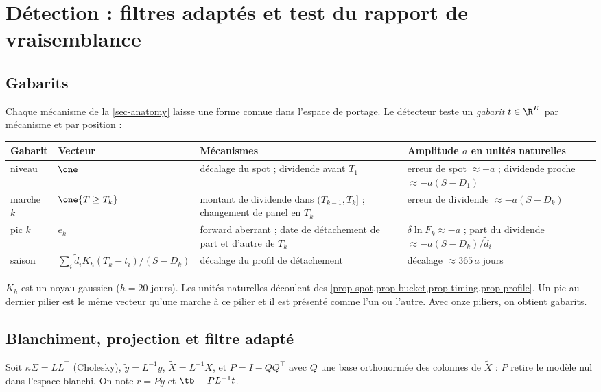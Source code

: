 \section{Détection : filtres adaptés et test du rapport de vraisemblance}\label{sec-detection}

\subsection{Gabarits}
Chaque mécanisme de la \cref{sec-anatomy} laisse une forme connue dans l'espace de portage. Le détecteur teste un
\emph{gabarit} $t\in\R^K$ par mécanisme et par position :
\begin{center}\small
\begin{tabular}{lp{3.3cm}p{4.3cm}p{4.6cm}}
\toprule
Gabarit & Vecteur & Mécanismes & Amplitude $a$ en unités naturelles\\
\midrule
niveau & $\one$ & décalage du spot ; dividende avant $T_1$ & erreur de spot $\approx-a$ ; dividende proche $\approx-a(S-D_1)$\\
marche $k$ & $\one\{T\ge T_k\}$ & montant de dividende dans $(T_{k-1},T_k]$ ; changement de panel en $T_k$ & erreur de dividende $\approx-a(S-D_k)$\\
pic $k$ & $e_k$ & forward aberrant ; date de détachement de part et d'autre de $T_k$ & $\delta\ln F_k\approx-a$ ; part du dividende $\approx-a(S-D_k)/\tilde d_i$\\
saison & $\sum_i\tilde d_iK_h(T_k-t_i)/(S-D_k)$ & décalage du profil de détachement & décalage $\approx365\,a$ jours\\
\bottomrule
\end{tabular}
\end{center}
$K_h$ est un noyau gaussien ($h=20$ jours). Les unités naturelles découlent des
\cref{prop-spot,prop-bucket,prop-timing,prop-profile}. Un pic au dernier pilier est le même vecteur qu'une marche à ce
pilier et il est présenté comme l'un ou l'autre. Avec onze piliers, on obtient \vNTemplates{} gabarits.

\subsection{Blanchiment, projection et filtre adapté}
Soit $\kappa\Sigma=LL^\top$ (Cholesky), $\tilde y=L^{-1}y$, $\tilde X=L^{-1}X$, et $P=I-QQ^\top$ avec $Q$ une base
orthonormée des colonnes de $\tilde X$ : $P$ retire le modèle nul dans l'espace blanchi. On note $r=P\tilde y$ et
$\tb=PL^{-1}t$.

